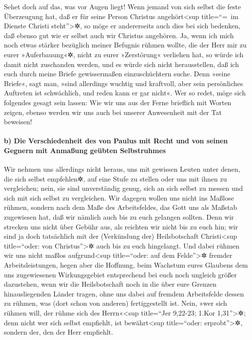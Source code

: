  Sehet doch auf das, was vor Augen liegt! Wenn jemand von
sich selbst die feste Überzeugung hat, daß er für seine Person Christus
angehört\textless sup title=``=~im Dienste Christi steht''\textgreater✲,
so möge er andererseits auch dies bei sich bedenken, daß ebenso gut wie
er selbst auch wir Christus angehören.  Ja, wenn ich mich
noch etwas stärker bezüglich meiner Befugnis rühmen wollte, die der Herr
mir zu eurer »Auferbauung«✲, nicht zu eurer »Zerstörung« verliehen hat,
so würde ich damit nicht zuschanden werden,  und es würde
sich nicht herausstellen, daß ich euch durch meine Briefe gewissermaßen
einzuschüchtern suche.  Denn »seine Briefe«, sagt man,
»sind allerdings wuchtig und kraftvoll, aber sein persönliches Auftreten
ist schwächlich, und reden kann er gar nicht«.  Wer so
redet, möge sich folgendes gesagt sein lassen: Wie wir uns aus der Ferne
brieflich mit Worten zeigen, ebenso werden wir uns auch bei unserer
Anwesenheit mit der Tat beweisen!

\hypertarget{b-die-verschiedenheit-des-von-paulus-mit-recht-und-von-seinen-gegnern-mit-anmauxdfung-geuxfcbten-selbstruhmes}{%
\paragraph{b) Die Verschiedenheit des von Paulus mit Recht und von
seinen Gegnern mit Anmaßung geübten
Selbstruhmes}\label{b-die-verschiedenheit-des-von-paulus-mit-recht-und-von-seinen-gegnern-mit-anmauxdfung-geuxfcbten-selbstruhmes}}

 Wir nehmen uns allerdings nicht heraus, uns mit gewissen
Leuten unter denen, die sich selbst empfehlen✲, auf eine Stufe zu
stellen oder uns mit ihnen zu vergleichen; nein, sie sind unverständig
genug, sich an sich selbst zu messen und sich mit sich selbst zu
vergleichen.  Wir dagegen wollen uns nicht ins Maßlose
rühmen, sondern nach dem Maße des Arbeitsfeldes, das Gott uns als
Maßstab zugewiesen hat, daß wir nämlich auch bis zu euch gelangen
sollten.  Denn wir strecken uns nicht über Gebühr aus,
als reichten wir nicht bis zu euch hin; wir sind ja doch tatsächlich mit
der (Verkündung der) Heilsbotschaft Christi\textless sup title=``oder:
von Christus''\textgreater✲ auch bis zu euch hingelangt. 
Und dabei rühmen wir uns nicht maßlos aufgrund\textless sup
title=``oder: auf dem Felde''\textgreater✲ fremder Arbeitsleistungen,
hegen aber die Hoffnung, beim Wachstum eures Glaubens dem uns
zugewiesenen Wirkungsgebiet entsprechend bei euch noch ungleich größer
dazustehen,  wenn wir die Heilsbotschaft noch in die über
eure Grenzen hinausliegenden Länder tragen, ohne uns dabei auf fremdem
Arbeitsfelde dessen zu rühmen, was (dort schon von anderen)
fertiggestellt ist.  Nein, »wer sich rühmen will, der
rühme sich des Herrn«\textless sup title=``Jer 9,22-23; 1.Kor
1,31''\textgreater✲;  denn nicht wer sich selbst
empfiehlt, ist bewährt\textless sup title=``oder:
erprobt''\textgreater✲, sondern der, den der Herr empfiehlt.

